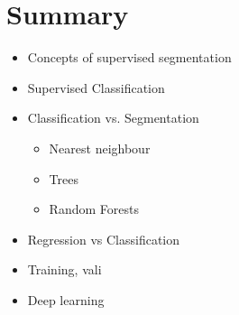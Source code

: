 \documentclass[letterpaper,10pt,english]{sphinxmanual}
\begin{document}
\chapter{Summary}
\label{\detokenize{05-SupervisedSegmentation:summary}}\begin{itemize}
\item {} 
\sphinxAtStartPar
Concepts of supervised segmentation

\item {} 
\sphinxAtStartPar
Supervised Classification

\item {} 
\sphinxAtStartPar
Classification vs. Segmentation
\begin{itemize}
\item {} 
\sphinxAtStartPar
Nearest neighbour

\item {} 
\sphinxAtStartPar
Trees

\item {} 
\sphinxAtStartPar
Random Forests

\end{itemize}

\item {} 
\sphinxAtStartPar
Regression vs Classification

\item {} 
\sphinxAtStartPar
Training, vali

\item {} 
\sphinxAtStartPar
Deep learning

\end{itemize}







\renewcommand{\indexname}{Index}
\printindex
\end{document}
